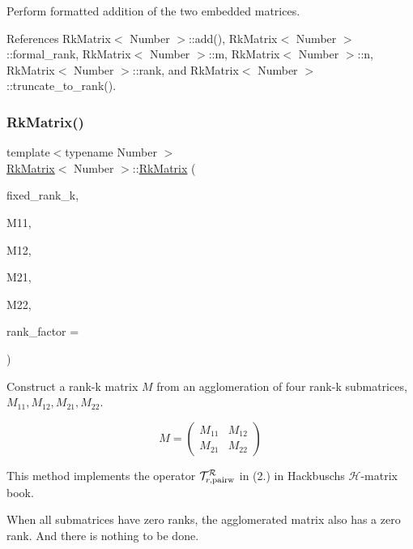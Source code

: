 Perform formatted addition of the two embedded matrices.

References Rk\+Matrix$<$ Number $>$\+::add(), Rk\+Matrix$<$ Number $>$\+::formal\+\_\+rank, Rk\+Matrix$<$ Number $>$\+::m, Rk\+Matrix$<$ Number $>$\+::n, Rk\+Matrix$<$ Number $>$\+::rank, and Rk\+Matrix$<$ Number $>$\+::truncate\+\_\+to\+\_\+rank().

\mbox{\label{classRkMatrix_ab2826404ecbffa257d56feac015a4c5f}} 
\subsubsection{\texorpdfstring{Rk\+Matrix()}{RkMatrix()}\hspace{0.1cm}{\footnotesize\ttfamily [17/19]}}
{\footnotesize\ttfamily template$<$typename Number $>$ \\
\hyperlink{classRkMatrix}{Rk\+Matrix}$<$ Number $>$\+::\hyperlink{classRkMatrix}{Rk\+Matrix} (\begin{DoxyParamCaption}\item[{const \hyperlink{classRkMatrix_add060bfc3a4cc77f858c3d6dd58cadd5}{size\+\_\+type}}]{fixed\+\_\+rank\+\_\+k,  }\item[{const \hyperlink{classRkMatrix}{Rk\+Matrix}$<$ Number $>$ \&}]{M11,  }\item[{const \hyperlink{classRkMatrix}{Rk\+Matrix}$<$ Number $>$ \&}]{M12,  }\item[{const \hyperlink{classRkMatrix}{Rk\+Matrix}$<$ Number $>$ \&}]{M21,  }\item[{const \hyperlink{classRkMatrix}{Rk\+Matrix}$<$ Number $>$ \&}]{M22,  }\item[{const Number}]{rank\+\_\+factor = {} }\end{DoxyParamCaption})}

Construct a rank-\/k matrix $M$ from an agglomeration of four rank-\/k submatrices, $M_{11}, M_{12}, M_{21}, M_{22}$.

\[ M = \begin{pmatrix} M_{11} & M_{12} \\ M_{21} & M_{22} \end{pmatrix} \]


\begin{DoxyDescription}
\item[Note ]This method implements the operator $\mathcal{T}_{r, {\rm pairw}}^{\mathcal{R}}$ in (2.) in Hackbusch\textquotesingle{}s $\mathcal{H}$-\/matrix book. 
\end{DoxyDescription}When all submatrices have zero ranks, the agglomerated matrix also has a zero rank. And there is nothing to be done.


